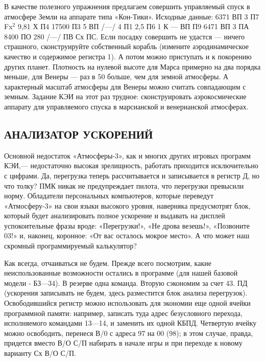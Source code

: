 \documentclass[11pt,a4paper,oneside]{article}
\begin{document}
В качестве полезного упражнения предлагаем совершить управляемый спуск в атмосфере Земли на аппарате типа «Кон-Тики». Исходные данные: 6371 ВП 3 П7 Fx$^{2}$ 9,81 Х П4 17500 П3 5 ВП /—/ 4 П1 2,5 П6 1 К — ВП П9 6471 ВП 3 ПА 8400 ПО 280 /—/ ПВ Сх ПС. Если посадку совершить не удастся — ничего страшного, сконструируйте собственный корабль (измените аэродинамическое качество и содержимое регистра 1). А потом можно приступать и к покорению других планет. Плотность на нулевой высоте для Марса примерно на два порядка меньше, для Венеры — раз в 50 больше, чем для земной атмосферы. А характерный масштаб атмосферы для Венеры можно считать совпадающим с земным. Задание КЭИ на этот раз трудное: сконструировать аэрокосмические аппарату для управляемого спуска в марсианской и венерианской атмосферах.

\subsection{АНАЛИЗАТОР УСКОРЕНИЙ}
Основной недостаток «Атмосферы-3», как и многих других игровых программ КЭИ,— недостаточно высокая зрелищность, работать приходится исключительно с цифрами. Да, перегрузка теперь рассчитывается и записывается в регистр Д, но что толку? ПМК никак не предупреждает пилота, что перегрузки превысили норму. Обладатели персональных компьютеров, которые переведут «Атмосферу-3» на свои языки высокого уровня, наверняка предусмотрят блок, который будет анализировать полное ускорение и выдавать на дисплей успокоительные фразы вроде: «Перегрузки!», «Не дрова везешь!», «Позвоните 03!» и, наконец, коронное: «От вас осталось мокрое место». А что может наш скромный программируемый калькулятор?

Как всегда, отчаиваться не будем. Прежде всего посмотрим, какие неиспользованные возможности остались в программе (для нашей базовой модели - БЗ—34). В резерве одна команда. Вторую сэкономим за счет 43. ПД (ускорения записывать не будем, здесь разместится блок анализа перегрузок). Освободившийся регистр можно использовать для экономии еще одной ячейки программной памяти: например, записать туда адрес безусловного перехода, исполняемого командами 13—14, и заменить их одной КБПД. Четвертую ячейку можно освободить, перенеся В/0 с адреса 97 на 00 (98); в этом случае, правда, придется вместо В/О С/П набирать в начале игры и при переходе к новому варианту Сх В/О С/П.
\end{document}
